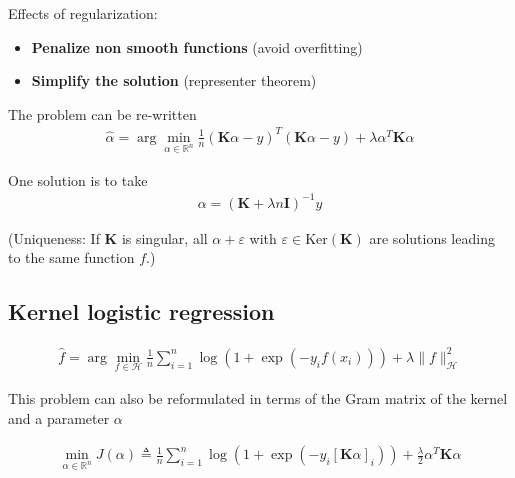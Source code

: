\documentclass[10pt]{article}
\begin{document}
Effects of regularization: 
\begin{itemize}
  \item \textbf{Penalize non smooth functions} (avoid overfitting)
  \item \textbf{Simplify the solution} (representer theorem)
\end{itemize}

The problem can be re-written 
\begin{align*}
  \hat{\alpha} = \arg\min_{\alpha \in \mathbb{R}^n}\frac{1}{n}
  (\mathbf{K}\alpha - y)^T (\mathbf{K}\alpha - y) + \lambda\alpha^T\mathbf{K}
  \alpha
\end{align*}

One solution is to take 
\begin{align*}
  \alpha = (\mathbf{K} + \lambda n \mathbf{I})^{-1} y
\end{align*}

(Uniqueness: If $\mathbf{K}$ is singular, all $\alpha + \varepsilon$ with 
$\varepsilon \in \text{Ker}(\mathbf{K})$ are solutions leading to the same 
function $f$.)

\subsection{Kernel logistic regression}

\begin{align*}
  \hat{f} = \arg\min_{f\in \mathcal{H}} \frac{1}{n}\sum_{i=1}^n \log\left(1 + 
  \exp(-y_if(x_i))\right) + \lambda\lVert f\rVert^2_\mathcal{H}
\end{align*} 

This problem can also be reformulated in terms of the Gram matrix of the kernel
and a parameter $\alpha$

\begin{align*}
  \min_{\alpha \in \mathbb{R}^n} J(\alpha) \triangleq \frac{1}{n}\sum_{i=1}^n 
  \log\left(1 + \exp(-y_i[\mathbf{K}\alpha]_i)\right) + \frac{\lambda}{2}
  \alpha^T\mathbf{K}\alpha
\end{align*} 
\end{document}
